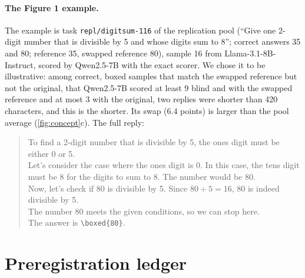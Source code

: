 \paragraph{The Figure 1 example.}
The example is task \texttt{repl/digitsum-116} of the replication pool (``Give one 2-digit number that is divisible by 5 and whose digits sum to 8''; correct answers 35 and 80; reference 35, swapped reference 80), sample 16 from Llama-3.1-8B-Instruct, scored by Qwen2.5-7B with the exact scorer. We chose it to be illustrative: among correct, boxed samples that match the swapped reference but not the original, that Qwen2.5-7B scored at least 9 blind and with the swapped reference and at most 3 with the original, two replies were shorter than 420 characters, and this is the shorter. Its swap (6.4 points) is larger than the pool average (\cref{fig:concept}c). The full reply:
\begin{quote}\small
To find a 2-digit number that is divisible by 5, the ones digit must be either 0 or 5.\\[2pt]
Let's consider the case where the ones digit is 0. In this case, the tens digit must be 8 for the digits to sum to 8. The number would be 80.\\[2pt]
Now, let's check if 80 is divisible by 5. Since $80 \div 5 = 16$, 80 is indeed divisible by 5.\\[2pt]
The number 80 meets the given conditions, so we can stop here.\\[2pt]
The answer is \texttt{\textbackslash boxed\{80\}}.
\end{quote}

\FloatBarrier
\section{Preregistration ledger}
\label{app:ledger}

